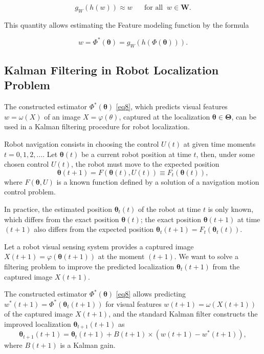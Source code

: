 \documentclass[conference]{IEEEtran} %
\def\mbW{\mathbf{W}}
\def\mbTheta{{\bm\Theta}}
\def\mbtheta{{\bm\theta}}
\begin{document}
\begin{equation}
\label{eq7}
	g_W(h(w)) \approx w \quad\,\,\,\,\text{for all} \;\; w \in \mbW.
\end{equation}

This quantity allows estimating the Feature modeling function by the formula

\begin{equation}
\label{eq8}
	w = \Phi^*(\mbtheta) = g_W(h(\Phi(\mbtheta))).
\end{equation}

\subsection{Kalman Filtering in Robot Localization Problem}

The constructed estimator $\Phi^*(\mbtheta)$ \eqref{eq8}, which predicts  visual features $w = \omega(X)$ of an image $X = \varphi(\theta)$, captured at the localization $\mbtheta \in \mbTheta$, can be used in a Kalman filtering procedure \cite{bib5} for robot localization.

Robot navigation consists in choosing the control $U(t)$ at given time moments $t = 0, 1, 2, \dots$. Let $\mbtheta(t)$ be a current robot position at time $t$, then, under some chosen control $U(t)$, the robot must move to the expected position
\begin{equation}
\label{eq9}
	\mbtheta(t+1) = F(\mbtheta(t), U(t)) \equiv F_t(\mbtheta(t)),
\end{equation}
where $F(\mbtheta, U)$ is a known function defined by a solution of a navigation motion control problem.

In practice, the estimated position $\mbtheta_t(t)$ of the robot at time $t$ is only known, which differs from the exact position $\mbtheta(t)$; the exact position $\mbtheta(t+1)$ at time $(t+1)$ also differs from the expected position $\mbtheta_t(t+1) = F_t(\mbtheta_t(t))$.

Let a robot visual sensing system provides a captured image $X(t+1) = \varphi(\mbtheta(t+1))$ at the moment $(t+1)$. We want to solve a filtering problem to improve the predicted localization $\mbtheta_t(t+1)$ from the captured image $X(t+1)$.

The constructed estimator $\Phi^*(\mbtheta)$ \eqref{eq8} allows predicting $w^*(t+1) = \Phi^*(\mbtheta_t(t+1))$ for visual features $w(t+1) = \omega(X(t+1))$ of the captured image $X(t+1)$, and the standard Kalman filter \cite{bib5} constructs the improved localization $\mbtheta_{t+1}(t+1)$ as
\begin{equation*}
	\mbtheta_{t+1}(t+1) = \mbtheta_t(t+1) + B(t+1)\times(w(t+1) - w^*(t+1)),
\end{equation*}
where $B(t+1)$ is a Kalman gain.
\end{document}
